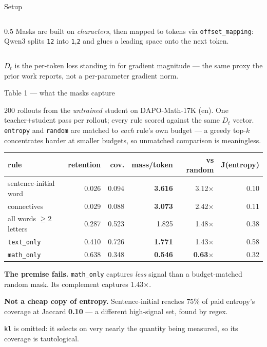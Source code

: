 \documentclass[aspectratio=169,11pt]{beamer}
\newcommand{\up}[1]{\textcolor{good}{\textbf{#1}}}
\newcommand{\dn}[1]{\textcolor{bad}{\textbf{#1}}}
\newcommand{\aside}[1]{{\footnotesize\textcolor{mut}{#1}}}
\begin{document}
\begin{frame}{Setup}
\begin{columns}[T]
\begin{column}{0.5\textwidth}
\medskip
\aside{Masks are built on \emph{characters}, then mapped to tokens via
\texttt{offset\_mapping}: Qwen3 splits \texttt{12} into \texttt{1},\texttt{2} and glues a
leading space onto the next token.}
\end{column}
\end{columns}

\vspace{0.6em}
\aside{$D_t$ is the per-token loss standing in for gradient magnitude --- the same proxy the prior work reports, not a per-parameter gradient norm.}

\end{frame}

\begin{frame}{Table 1 --- what the masks capture}

\aside{200 rollouts from the \emph{untrained} student on DAPO-Math-17K (en). One
teacher+student pass per rollout; every rule scored against the same $D_t$ vector.
\texttt{entropy} and \texttt{random} are matched to \emph{each} rule's own budget --- a
greedy top-$k$ concentrates harder at smaller budgets, so unmatched comparison is meaningless.}

\vspace{0.8em}
\centering
{\small
\begin{tabular}{@{}lrrrrr@{}}
\toprule
\textbf{rule} & \textbf{retention} & \textbf{cov.} & \textbf{mass/token} & \textbf{vs random} & \textbf{J(entropy)} \\
\midrule
sentence-initial word      & 0.026 & 0.094 & \up{3.616} & 3.12$\times$ & 0.10 \\
connectives                & 0.029 & 0.088 & \up{3.073} & 2.42$\times$ & 0.11 \\
all words $\geq2$ letters  & 0.287 & 0.523 & 1.825 & 1.48$\times$ & 0.38 \\
\texttt{text\_only}        & 0.410 & 0.726 & \up{1.771} & 1.43$\times$ & 0.58 \\
\texttt{math\_only}        & 0.638 & 0.348 & \dn{0.546} & \dn{0.63$\times$} & 0.32 \\
\bottomrule
\end{tabular}}

\flushleft
\vspace{0.8em}
\textbf{The premise fails.} \texttt{math\_only} captures \emph{less} signal than a
budget-matched random mask. Its complement captures 1.43$\times$.

\medskip
\textbf{Not a cheap copy of entropy.} Sentence-initial reaches 75\% of paid entropy's
coverage at Jaccard \textbf{0.10} --- a different high-signal set, found by regex.

\medskip
\aside{\texttt{kl} is omitted: it selects on very nearly the quantity being measured, so its coverage is tautological.}

\end{frame}
\end{document}

